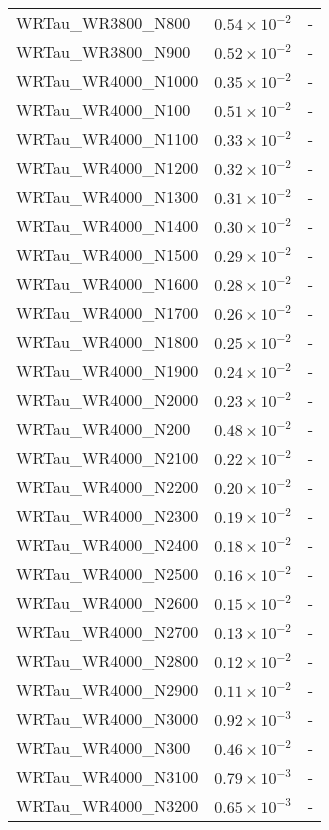 \begin{longtable}[c]{| C{.35\textwidth} | C{.15\textwidth} | C{.1\textwidth}|}
    WRTau\_WR3800\_N800 & $0.54\times10^{-2}$ & - \\
    WRTau\_WR3800\_N900 & $0.52\times10^{-2}$ & - \\
    WRTau\_WR4000\_N1000 & $0.35\times10^{-2}$ & - \\
    WRTau\_WR4000\_N100 & $0.51\times10^{-2}$ & - \\
    WRTau\_WR4000\_N1100 & $0.33\times10^{-2}$ & - \\
    WRTau\_WR4000\_N1200 & $0.32\times10^{-2}$ & - \\
    WRTau\_WR4000\_N1300 & $0.31\times10^{-2}$ & - \\
    WRTau\_WR4000\_N1400 & $0.30\times10^{-2}$ & - \\
    WRTau\_WR4000\_N1500 & $0.29\times10^{-2}$ & - \\
    WRTau\_WR4000\_N1600 & $0.28\times10^{-2}$ & - \\
    WRTau\_WR4000\_N1700 & $0.26\times10^{-2}$ & - \\
    WRTau\_WR4000\_N1800 & $0.25\times10^{-2}$ & - \\
    WRTau\_WR4000\_N1900 & $0.24\times10^{-2}$ & - \\
    WRTau\_WR4000\_N2000 & $0.23\times10^{-2}$ & - \\
    WRTau\_WR4000\_N200 & $0.48\times10^{-2}$ & - \\
    WRTau\_WR4000\_N2100 & $0.22\times10^{-2}$ & - \\
    WRTau\_WR4000\_N2200 & $0.20\times10^{-2}$ & - \\
    WRTau\_WR4000\_N2300 & $0.19\times10^{-2}$ & - \\
    WRTau\_WR4000\_N2400 & $0.18\times10^{-2}$ & - \\
    WRTau\_WR4000\_N2500 & $0.16\times10^{-2}$ & - \\
    WRTau\_WR4000\_N2600 & $0.15\times10^{-2}$ & - \\
    WRTau\_WR4000\_N2700 & $0.13\times10^{-2}$ & - \\
    WRTau\_WR4000\_N2800 & $0.12\times10^{-2}$ & - \\
    WRTau\_WR4000\_N2900 & $0.11\times10^{-2}$ & - \\
    WRTau\_WR4000\_N3000 & $0.92\times10^{-3}$ & - \\
    WRTau\_WR4000\_N300 & $0.46\times10^{-2}$ & - \\
    WRTau\_WR4000\_N3100 & $0.79\times10^{-3}$ & - \\
    WRTau\_WR4000\_N3200 & $0.65\times10^{-3}$ & - \\

\end{longtable}
